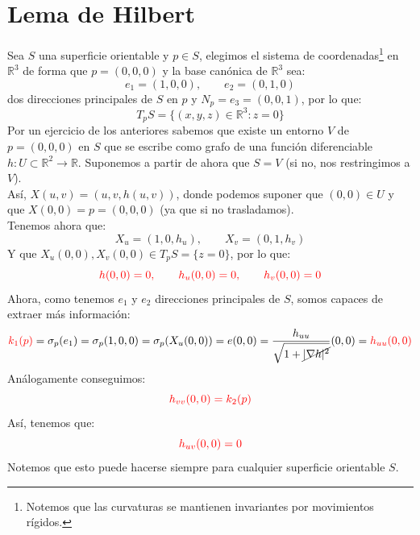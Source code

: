 \section{Lema de Hilbert}
\noindent
Sea $S$ una superficie orientable y $p\in S$, elegimos el sistema de coordenadas\footnote{Notemos que las curvaturas se mantienen invariantes por movimientos rígidos.} en $\mathbb{R}^3$ de forma que $p = (0,0,0)$ y la base canónica de $\mathbb{R}^3$ sea:
\begin{equation*}
    e_1 = (1,0,0), \qquad e_2 = (0,1,0)
\end{equation*}
dos direcciones principales de $S$ en $p$ y $N_p = e_3 = (0,0,1)$, por lo que:
\begin{equation*}
    T_pS = \{(x,y,z)\in \mathbb{R}^3 : z=0 \}
\end{equation*}
Por un ejercicio de los anteriores sabemos que existe un entorno $V$ de $p=(0,0,0)$ en $S$ que se escribe como grafo de una función diferenciable $h:U\subset\mathbb{R}^2\to\mathbb{R}$. Suponemos a partir de ahora que $S=V$ (si no, nos restringimos a $V$).\\

\noindent
Así, $X(u,v) = (u,v,h(u,v))$, donde podemos suponer que $(0,0)\in U$ y que $X(0,0)=p=(0,0,0)$ (ya que si no trasladamos).\\

\noindent
Tenemos ahora que:
\begin{equation*}
    X_u = (1,0,h_u), \qquad X_v = (0,1,h_v)
\end{equation*}
Y que $X_u(0,0),X_v(0,0)\in T_pS = \{z=0\}$, por lo que:
\begin{equation*}
    {\color{red}h(0,0) = 0, \qquad h_u(0,0) =  0, \qquad h_v(0,0) = 0}
\end{equation*}
Ahora, como tenemos $e_1$ y $e_2$ direcciones principales de $S$, somos capaces de extraer más información:
\begin{equation*}
    {\color{red}k_1(p)} = \sigma_p(e_1) = \sigma_p(1,0,0) = \sigma_p(X_u(0,0)) = e(0,0) = \frac{h_{uu}}{\sqrt{1+\cancel{|\nabla h|^2}}}(0,0) = {\color{red}h_{uu}(0,0)}
\end{equation*}
Análogamente conseguimos:
\begin{equation*}
    {\color{red}h_{vv}(0,0) = k_2(p)}
\end{equation*}
Así, tenemos que:
\begin{equation*}
    {\color{red}h_{uv}(0,0) = 0}
\end{equation*}
Notemos que esto puede hacerse siempre para cualquier superficie orientable $S$.\\


